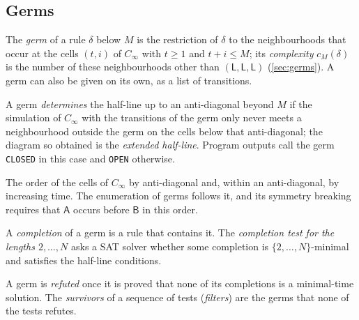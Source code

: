{\subsection{Germs}\label{app:gl-germs}
\begin{description}[style=unboxed,leftmargin=1em,font=\normalfont\bfseries,itemsep=1pt,parsep=0pt,topsep=2pt]
\item[Germ; complexity $c_M(\delta)$.] The \emph{germ} of a rule
  $\delta$ below $M$ is the restriction of $\delta$ to the neighbourhoods
  that occur at the cells $(t,i)$ of $C_\infty$ with $t\ge1$ and $t+i\le
  M$; its \emph{complexity} $c_M(\delta)$ is the number of these
  neighbourhoods other than $(\mathsf L,\mathsf L,\mathsf L)$
  (\cref{sec:germs}). A germ can also be given on its own, as a list of
  transitions.
\item[Determined; extended half-line; closed, open.] A germ
  \emph{determines} the half-line up to an anti-diagonal beyond $M$ if the
  simulation of $C_\infty$ with the transitions of the germ only never
  meets a neighbourhood outside the germ on the cells below that
  anti-diagonal; the diagram so obtained is the \emph{extended half-line}.
  Program outputs call the germ \texttt{CLOSED} in this case and
  \texttt{OPEN} otherwise.
\item[Anti-diagonal order.] The order of the cells of $C_\infty$ by
  anti-diagonal and, within an anti-diagonal, by increasing time. The
  enumeration of germs follows it, and its symmetry breaking requires that
  $\mathsf A$ occurs before $\mathsf B$ in this order.
\item[Completion; completion test.] A \emph{completion} of a germ is a
  rule that contains it. The \emph{completion test for the lengths
  $2,\dots,N$} asks a SAT solver whether some completion is
  $\{2,\dots,N\}$-minimal and satisfies the half-line conditions.
\item[Refuted; survivor; filter.] A germ is \emph{refuted} once it is
  proved that none of its completions is a minimal-time solution. The
  \emph{survivors} of a sequence of tests (\emph{filters}) are the germs
  that none of the tests refutes.
\end{description}

}
